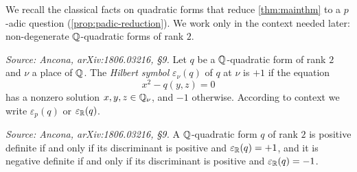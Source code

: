 We recall the classical facts on quadratic forms that reduce \cref{thm:mainthm}
to a \(p\)-adic question (\cref{prop:padic-reduction}). We work only in the
context needed later: non-degenerate \(\mathbb{Q}\)-quadratic forms of rank \(2\).

\begin{definition}
  \label{def:hilbert-symbol}
  \textit{Source: Ancona, arXiv:1806.03216, §9.}
  Let \(q\) be a \(\mathbb{Q}\)-quadratic form of rank \(2\) and \(\nu\) a place of
  \(\mathbb{Q}\). The \emph{Hilbert symbol} \(\varepsilon_\nu(q)\) of \(q\) at \(\nu\) is
  \(+1\) if the equation
  \[x^2 - q(y,z) = 0\]
  has a nonzero solution \(x, y, z \in \mathbb{Q}_\nu\), and \(-1\) otherwise. According
  to context we write \(\varepsilon_p(q)\) or \(\varepsilon_{\mathbb{R}}(q)\).
\end{definition}

\begin{remark}
  \label{rem:rank2-signature}
  \textit{Source: Ancona, arXiv:1806.03216, §9.}
  A \(\mathbb{Q}\)-quadratic form \(q\) of rank \(2\) is positive definite if and only
  if its discriminant is positive and \(\varepsilon_{\mathbb{R}}(q) = +1\), and it is
  negative definite if and only if its discriminant is positive and
  \(\varepsilon_{\mathbb{R}}(q) = -1\).
\end{remark}

